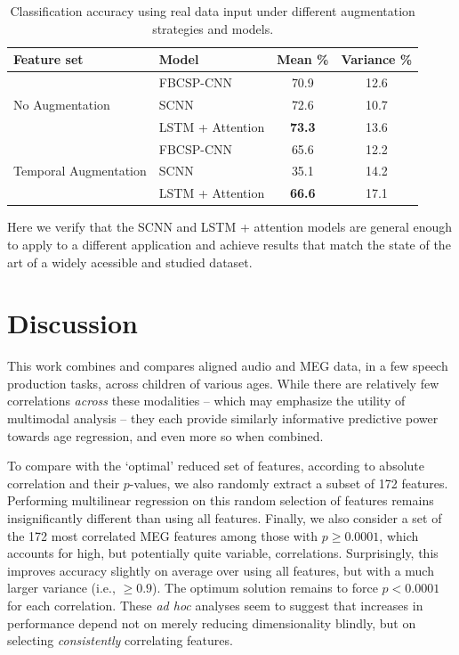 \documentclass[utf8]{frontiersSCNS} %
\begin{document}
\begin{table}[t]
  \centering
  \label{tab:end2end_results}
  \begin{tabular}{l l | c | c}
    \toprule
    \textbf{Feature set} & \textbf{Model} & \textbf{Mean \%} & \textbf{Variance \%} \\
    \toprule
    \multirow{3}{*}{No Augmentation}
                         & FBCSP-CNN           & 70.9 & 12.6  \\
                         & SCNN                & 72.6 & 10.7  \\
                         & LSTM + Attention    & \textbf{73.3} & 13.6  \\ 
    \midrule
    \multirow{3}{*}{Temporal Augmentation}
                         & FBCSP-CNN           & 65.6 & 12.2  \\
                         & SCNN                & 35.1 & 14.2  \\
                         & LSTM + Attention    & \textbf{66.6} & 17.1  \\ 
    \bottomrule
  \end{tabular}
  \caption{Classification accuracy using real data input under different augmentation strategies and models.}
\end{table}

Here we verify that the SCNN and LSTM + attention models are general enough to apply to a different application and achieve results that match the state of the art of a widely acessible and studied dataset.  

\section{Discussion}


This work combines and compares aligned audio and MEG data, in a few speech production tasks, across children of various ages. While there are relatively few correlations {\em across} these modalities -- which may emphasize the utility of multimodal analysis -- they each provide similarly informative predictive power towards age regression, and even more so when combined.

To compare with the `optimal' reduced set of features, according to absolute correlation and their $p$-values, we also randomly extract a subset of 172 features. Performing multilinear regression on this random selection of features remains insignificantly different than using all features. Finally, we also consider a set of the 172 most correlated MEG features among those with $p \geq 0.0001$, which accounts for high, but potentially quite variable, correlations. Surprisingly, this improves accuracy slightly on average over using all features, but with a much larger variance (i.e., $\geq 0.9$). The optimum solution remains to force $p<0.0001$ for each correlation. These {\em ad hoc} analyses seem to suggest that increases in performance depend not on merely reducing dimensionality blindly, but on selecting {\em consistently} correlating features. %
\end{document}
